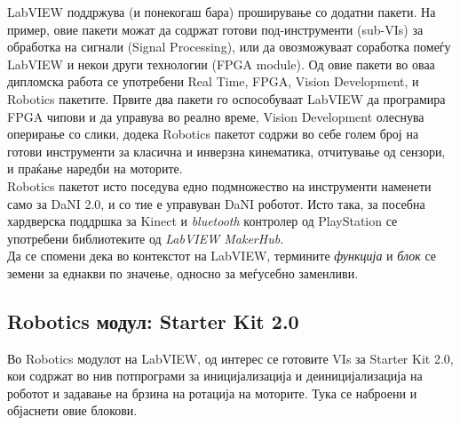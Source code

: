 \documentclass[11pt]{article}
\begin{document}
  LabVIEW поддржува (и понекогаш бара) проширување со додатни пакети. На пример, овие пакети можат да содржат готови под-инструменти (sub-VIs) за обработка на сигнали (Signal Processing), или да овозможуваат соработка помеѓу LabVIEW и некои други технологии (FPGA module). Од овие пакети во оваа дипломска работа се употребени Real Time, FPGA, Vision Development, и Robotics пакетите. Првите два пакети го оспособуваат LabVIEW да програмира FPGA чипови и да управува во реално време, Vision Development олеснува оперирање со слики, додека Robotics пакетот содржи во себе голем број на готови инструменти за класична и инверзна кинематика, отчитување од сензори, и праќање наредби на моторите.
  \\
  Robotics пакетот исто поседува едно подмножество на инструменти наменети само за DaNI 2.0, и со тие е управуван DaNI роботот. Исто така, за посебна хардверска поддршка за Kinect и \textit{bluetooth} контролер од PlayStation се употребени библиотеките од \textit{LabVIEW MakerHub}.
  \\
  Да се спомени дека во контекстот на LabVIEW, термините \textit{функција} и \textit{блок} се земени за еднакви по значење, односно за меѓусебно заменливи.

  \subsection{Robotics модул: Starter Kit 2.0}
    Во Robotics модулот на LabVIEW, од интерес се готовите VIs за Starter Kit 2.0, кои содржат во нив потпрограми за иницијализација и деиницијализација на роботот и задавање на брзина на ротација на моторите. Тука се наброени и објаснети овие блокови.
\end{document}
